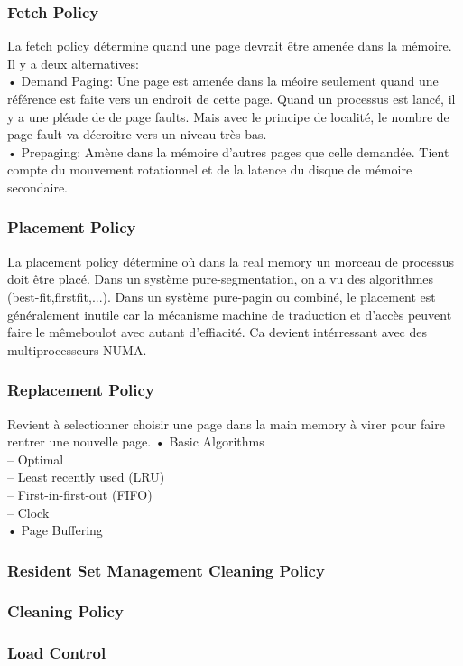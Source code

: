 \subsubsection{Fetch Policy}
La fetch policy détermine quand une page devrait être amenée dans la mémoire. Il y a deux alternatives:\\
• Demand Paging: Une page est amenée dans la méoire seulement quand une référence est faite vers un endroit de cette page. Quand un processus est lancé, il y a une pléade de de page faults. Mais avec le principe de localité, le nombre de page fault va décroitre vers un niveau très bas.\\
• Prepaging: Amène dans la mémoire d'autres pages que celle demandée. Tient compte du mouvement rotationnel et de la latence du disque de mémoire secondaire.\\
\subsubsection{Placement Policy}
La placement policy détermine où dans la real memory un morceau de processus doit être placé. Dans un système pure-segmentation, on a vu des algorithmes (best-fit,firstfit,...). Dans un système pure-pagin ou combiné, le placement est généralement inutile car la mécanisme machine de traduction et d'accès peuvent faire le mêmeboulot avec autant d'effiacité. Ca devient intérressant avec des multiprocesseurs NUMA.
\subsubsection{Replacement Policy}
Revient à selectionner choisir une page dans la main memory à virer pour faire rentrer une nouvelle page.
• Basic Algorithms\\
– Optimal\\
– Least recently used (LRU)\\
– First-in-first-out (FIFO) \\
– Clock\\
• Page Buffering
\subsubsection{Resident Set Management Cleaning Policy}
\subsubsection{Cleaning Policy}
\subsubsection{Load Control}
